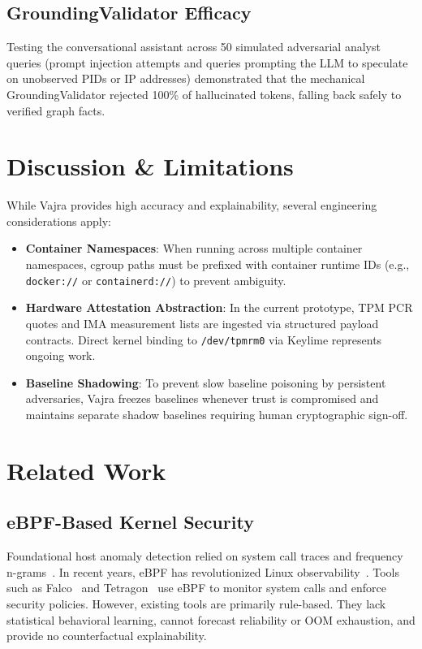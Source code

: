 \documentclass[conference]{IEEEtran}
\begin{document}
\subsection{GroundingValidator Efficacy}
Testing the conversational assistant across 50 simulated adversarial analyst queries (prompt injection attempts and queries prompting the LLM to speculate on unobserved PIDs or IP addresses) demonstrated that the mechanical GroundingValidator rejected 100\% of hallucinated tokens, falling back safely to verified graph facts.

\section{Discussion \& Limitations}
\label{sec:discussion}
While Vajra provides high accuracy and explainability, several engineering considerations apply:
\begin{itemize}
    \item \textbf{Container Namespaces}: When running across multiple container namespaces, cgroup paths must be prefixed with container runtime IDs (e.g., \texttt{docker://} or \texttt{containerd://}) to prevent ambiguity.
    \item \textbf{Hardware Attestation Abstraction}: In the current prototype, TPM PCR quotes and IMA measurement lists are ingested via structured payload contracts. Direct kernel binding to \texttt{/dev/tpmrm0} via Keylime represents ongoing work.
    \item \textbf{Baseline Shadowing}: To prevent slow baseline poisoning by persistent adversaries, Vajra freezes baselines whenever trust is compromised and maintains separate shadow baselines requiring human cryptographic sign-off.
\end{itemize}

\section{Related Work}
\label{sec:related_work}

\subsection{eBPF-Based Kernel Security}
Foundational host anomaly detection relied on system call traces and frequency n-grams~\cite{warrender1999detecting,hofmeyr1998intrusion}. In recent years, eBPF has revolutionized Linux observability~\cite{gregg2019bpf}. Tools such as Falco~\cite{falco2024} and Tetragon~\cite{tetragon2024} use eBPF to monitor system calls and enforce security policies. However, existing tools are primarily rule-based. They lack statistical behavioral learning, cannot forecast reliability or OOM exhaustion, and provide no counterfactual explainability.
\end{document}
